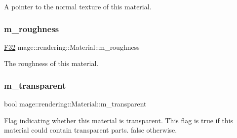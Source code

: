 A pointer to the normal texture of this material. \hypertarget{classmage_1_1rendering_1_1_material_a14b420a0bdb8cb1f0fa57aa31bd09ae1}{}\label{classmage_1_1rendering_1_1_material_a14b420a0bdb8cb1f0fa57aa31bd09ae1} 
\subsubsection{\texorpdfstring{m\+\_\+roughness}{m\_roughness}}
{\footnotesize\ttfamily \hyperlink{namespacemage_aa97e833b45f06d60a0a9c4fc22ae02c0}{F32} mage\+::rendering\+::\+Material\+::m\+\_\+roughness\hspace{0.3cm}{\ttfamily [private]}}

The roughness of this material. \hypertarget{classmage_1_1rendering_1_1_material_af9f8d0fdb613bce1a4c3683836649bf3}{}\label{classmage_1_1rendering_1_1_material_af9f8d0fdb613bce1a4c3683836649bf3} 
\subsubsection{\texorpdfstring{m\+\_\+transparent}{m\_transparent}}
{\footnotesize\ttfamily bool mage\+::rendering\+::\+Material\+::m\+\_\+transparent\hspace{0.3cm}{\ttfamily [private]}}

Flag indicating whether this material is transparent. This flag is {\ttfamily true} if this material could contain transparent parts. {\ttfamily false} otherwise. 